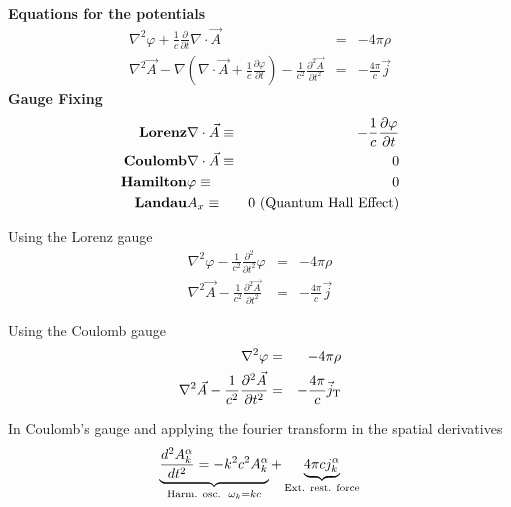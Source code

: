 \documentclass[12pt,a4paper]{article}
\begin{document}
\textbf{Equations for the potentials}
\begin{eqnarray}
	\nabla^2 \varphi + \frac{1}{c}\frac{\partial}{\partial t}\nabla\cdot \vec{A} & = & -4\pi\rho \\	
	\nabla^2\vec{A} - \nabla \left( \nabla\cdot \vec{A}+ \frac{1}{c}\frac{\partial \varphi}{\partial t}\right)-\frac{1}{c^2}\frac{\partial^2  \vec{A}}{\partial t^2} & = & -\frac{4\pi}{c}\vec{j}
\end{eqnarray}
\textbf{Gauge Fixing}
\begin{eqnarray}
	\text{\textbf{Lorenz}}& \nabla \cdot \vec{A} \equiv & - \frac{1}{c}\frac{\partial \varphi}{\partial t} \\
	\text{\textbf{Coulomb}}& \nabla \cdot \vec{A} \equiv & 0\\
	\text{\textbf{Hamilton}} & \varphi \equiv & 0 \\
	\text{\textbf{Landau}} & A_x \equiv & 0 \text{ (Quantum Hall Effect)}
\end{eqnarray}

Using the Lorenz gauge
\begin{eqnarray}
\nabla^2 \varphi - \frac{1}{c^2}\frac{\partial^2}{\partial t^2}\varphi & = & -4\pi\rho \\	
	\nabla^2\vec{A}-\frac{1}{c^2}\frac{\partial^2  \vec{A}}{\partial t^2} & = & -\frac{4\pi}{c}\vec{j}
\end{eqnarray} 

Using the Coulomb gauge
\begin{eqnarray}
\nabla^2 \varphi  & = & -4\pi\rho \\	
	\nabla^2\vec{A}-\frac{1}{c^2}\frac{\partial^2  \vec{A}}{\partial t^2} & = & -\frac{4\pi}{c}\vec{j}_{\rm  T}
\end{eqnarray} 

In Coulomb's gauge and applying the fourier transform in the spatial derivatives
\begin{equation}
	\underbrace{\frac{d^2 A_k^{\alpha}}{dt^2}= -k^2c^2 A_k^{\alpha}}_{\text{Harm. osc.} \\ \omega_k = kc}  +  \underbrace{4\pi c j_k^{\alpha}}_{\text{Ext. rest. force}}
\end{equation}
\end{document}
